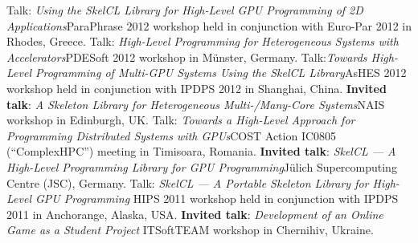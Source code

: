 \documentclass[11pt,a4paper]{moderncv}
\begin{document}
       {Talk: \emph{Using the SkelCL Library for High-Level GPU Programming of
        2D Applications}\newline \small ParaPhrase 2012 workshop held in
        conjunction with Euro-Par 2012 in Rhodes, Greece.}
       {Talk: \emph{High-Level Programming for Heterogeneous Systems with
        Accelerators}\newline \small PDESoft 2012 workshop in Münster, Germany.}
       {Talk:\emph{Towards High-Level Programming of Multi-GPU Systems Using
        the SkelCL Library}\newline \small AsHES 2012 workshop held in
        conjunction with IPDPS 2012 in Shanghai, China.}
       {\textbf{Invited talk}: \emph{A Skeleton Library for Heterogeneous
        Multi-/Many-Core Systems}\newline \small NAIS workshop in Edinburgh, UK.}
       {Talk: \emph{Towards a High-Level Approach for Programming Distributed
        Systems with GPUs}\newline \small COST Action IC0805 (``ComplexHPC'')
        meeting in Timisoara, Romania.}
       {\textbf{Invited talk}: \emph{SkelCL --- A High-Level Programming Library for GPU
        Programming}\newline \small Jülich Supercomputing Centre (JSC), Germany.}
       {Talk: \emph{SkelCL --- A Portable Skeleton Library for High-Level
        GPU Programming}\newline
        \small HIPS 2011 workshop held in conjunction with IPDPS 2011 in
        Anchorange, Alaska, USA.}
       {\textbf{Invited talk}: \emph{Development of an Online Game as a Student Project}\newline
        \small ITSoftTEAM workshop in Chernihiv, Ukraine.}

\end{document}
